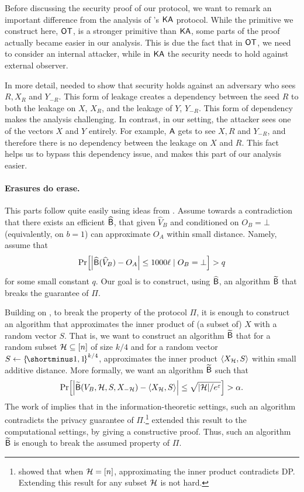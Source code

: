 \begin{remark}\label{remark:OTvsKA}
Before discussing the security proof of our protocol, we want to remark an important difference from the  analysis of \cite{HaitnerMST22}'s ${\sf KA}$ protocol. While the primitive we construct here, ${\sf OT}$, is a stronger primitive than ${\sf KA}$, some parts of the proof actually became easier in our analysis. This is due the fact that in ${\sf OT}$, we need to consider an internal attacker, while in ${\sf KA}$ the security needs to hold against external observer.

In more detail, \cite{HaitnerMST22} needed to show that security holds against an adversary who sees $R, X_{R}$ and $Y_{-R}$. This form of leakage creates a dependency between the seed $R$ to both the leakage on  $X$, $X_R$, and the leakage of $Y$, $Y_{-R}$. This form of dependency makes the analysis challenging. In contrast, in our setting, the attacker sees one of the vectors $X$ and $Y$ entirely. For example, $\mathsf{A}$ gets to see $X, R$ and $Y_{-R}$, and therefore there is no dependency between the leakage on $X$ and $R$. This fact helps us to bypass this dependency issue, and makes this part of our analysis easier.
\end{remark}

\paragraph{Erasures do erase.} This parts follow quite easily using ideas from \cite{McGregorMPRTV10,HaitnerMST22}.
Assume towards a contradiction that there exists an efficient  $\widehat{\mathsf{B}}$, that given $\widehat{V}_B$ and conditioned on $O_B=\bot$ (equivalently, on $b=1$)  can approximate $O_A$ within small distance. Namely, assume that
$$
\pr{\size{\widehat{\Bc}(\widehat{V}_B) - O_A} \leq 1000 \ell \mid O_B=\bot} >q 
$$
for some small constant $q$. Our goal is to  construct, using $\widehat{\mathsf{B}}$, an algorithm $\widetilde{\mathsf{B}}$ that breaks the \CDP guarantee of $\Pi$.


Building on \cite{McGregorMPRTV10,HaitnerMST22}, to break the \CDP property of the protocol $\Pi$, it is enough to construct an algorithm that approximates the inner product of (a subset of) $X$ with a random vector $S$. That is, we want to construct an algorithm $\widetilde{\mathsf{B}}$ that for a random subset ${\cal H}\subseteq [n]$ of size $k/4$ and for a random vector $S\gets \oo^{k/4}$,  approximates  the inner product $\langle X_{{\cal H}}, S \rangle$ within small additive  distance. More formally, we want an algorithm $\widetilde{\mathsf{B}}$ such that 
$$\pr{\size{\widetilde{\Bc}(V_B,\cH,S, X_{-\cH})-\langle X_{\cH}, S \rangle}\le \sqrt{\size{\cH}/e^\eps}}> \alpha.$$
The work of \cite{McGregorMPRTV10} implies that in the information-theoretic settings, such an algorithm contradicts the privacy guarantee of $\Pi$.\footnote{\cite{McGregorMPRTV10} showed that when ${\cal H}=[n]$, approximating the inner product contradicts DP. Extending this result for any subset ${\cal H}$ is not hard.} \cite{HaitnerMST22} extended this result to the computational settings, by giving a constructive proof. Thus, such an algorithm $\widetilde{\mathsf{B}}$ is enough to break the assumed \CDP property of $\Pi$.


